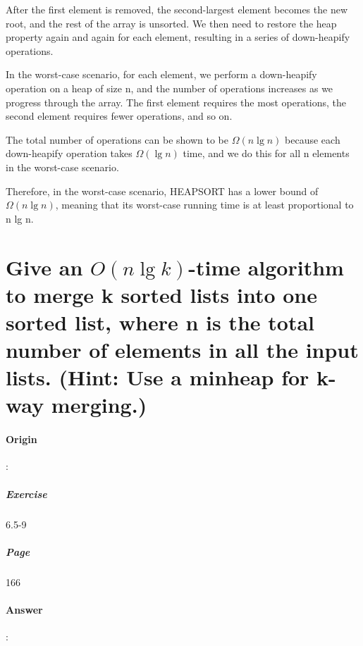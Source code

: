 \documentclass{article}
\begin{document}
  After the first element is removed, the second-largest element becomes the new root, and the rest of the array is unsorted. We then need to restore the heap property again and again for each element, resulting in a series of down-heapify operations.

  In the worst-case scenario, for each element, we perform a down-heapify operation on a heap of size n, and the number of operations increases as we progress through the array. The first element requires the most operations, the second element requires fewer operations, and so on.

  The total number of operations can be shown to be $\Omega (n \lg n)$ because each down-heapify operation takes $\Omega (\lg n)$ time, and we do this for all n elements in the worst-case scenario.

  Therefore, in the worst-case scenario, HEAPSORT has a lower bound of $\Omega (n \lg n)$, meaning that its worst-case running time is at least proportional to n lg n.

  \section{Give an $O (n \lg k)$-time algorithm to merge k sorted lists into one sorted list, where n is the total number of elements in all the input lists. (Hint: Use a minheap for k-way merging.)}
  \paragraph{Origin}:
    \subparagraph{Exercise}6.5-9
    \subparagraph{Page}166
  \paragraph{Answer}:
  
\end{document}
